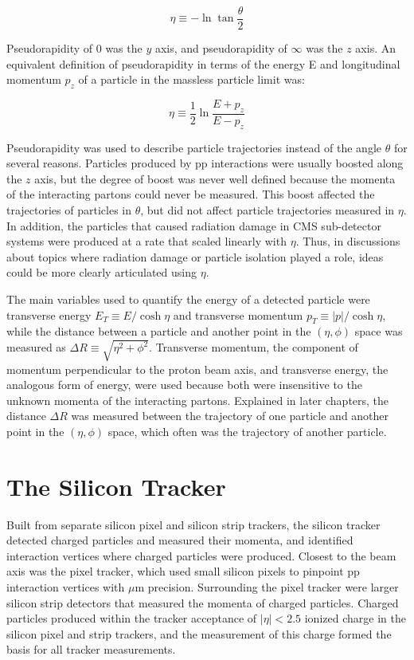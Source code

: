 \begin{equation}
	\eta \equiv -\ln{\tan{\frac{\theta}{2}}}
\end{equation}

Pseudorapidity of 0 was the $y$ axis, and pseudorapidity of $\infty$ was the $z$ axis.
An equivalent definition of pseudorapidity in terms of the energy E and longitudinal 
momentum $p_{z}$ of a particle in the massless particle limit was:

\begin{equation}
	\eta \equiv \frac{1}{2}\ln{\frac{E+p_{z}}{E-p_{z}}}
\end{equation}

Pseudorapidity was used to describe particle trajectories instead of the angle $\theta$ for several reasons.  Particles 
produced by pp interactions were usually boosted along the $z$ axis, but the degree of boost was never well 
defined because the momenta of the interacting partons could never be measured.  This boost affected the 
trajectories of particles in $\theta$, but did not affect particle trajectories measured in $\eta$.  In 
addition, the particles that caused radiation damage in CMS sub-detector systems were produced at 
a rate that scaled linearly with $\eta$.  Thus, in discussions about topics where radiation damage 
or particle isolation played a role, ideas could be more clearly articulated using $\eta$.

The main variables used to quantify the energy of a detected particle were transverse energy 
$E_{T} \equiv E/\cosh{\eta}$ and transverse momentum $p_{T} \equiv |p|/\cosh{\eta}$, while the distance between 
a particle and another point in the $(\eta, \phi)$ space was measured as $\Delta R \equiv \sqrt{\eta^{2} + \phi^{2}}$.  
Transverse momentum, the component of momentum perpendicular to the proton beam axis, and transverse energy, the 
analogous form of energy, were used because both were insensitive to the unknown momenta of the interacting partons.  
Explained in later chapters, the distance $\Delta R$ was measured between the trajectory of one particle 
and another point in the $(\eta, \phi)$ space, which often was the trajectory of another particle.

\section{The Silicon Tracker}
\label{sec:siTrackerDescription}
Built from separate silicon pixel and silicon strip trackers, the silicon tracker detected charged particles  
and measured their momenta, and identified interaction vertices where charged particles were produced.  Closest 
to the beam axis was the pixel tracker, which used small silicon pixels to pinpoint pp interaction vertices 
with $\mu$m precision.  Surrounding the pixel tracker were larger silicon strip detectors that measured the 
momenta of charged particles.  Charged particles produced within the tracker acceptance of $|\eta| < 2.5$ ionized 
charge in the silicon pixel and strip trackers, and the measurement of this charge formed the basis for all tracker 
measurements.


